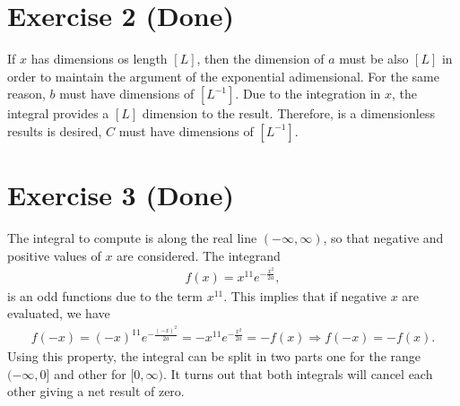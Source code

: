 \documentclass[letterpaper,11pt,twoside]{article}
\begin{document}
\section{Exercise 2 (Done)}
If $x$ has dimensions os length $[L]$, then the dimension of $a$ must be also $[L]$ in order to maintain the argument of the exponential adimensional.
For the same reason, $b$ must have dimensions of $[L^{-1}]$. Due to the integration in $x$, the integral provides a $[L]$ dimension to the result. Therefore,
is a dimensionless results is desired, $C$ must have dimensions of $[L^{-1}]$.

\section{Exercise 3 (Done)}
The integral to compute is along the real line $(-\infty,\infty)$, so that negative and positive values of $x$ are considered.
The integrand
\begin{align}
  f(x)=x^{11}e^{-\frac{x^2}{2a}},
\end{align}
is an odd functions due to the term $x^{11}$. This implies that if negative $x$ are evaluated, we have
\begin{align*}
  f(-x)=(-x)^{11}e^{-\frac{(-x)^2}{2a}}=-x^{11}e^{-\frac{x^2}{2a}}=-f(x)\Longrightarrow f(-x)=-f(x).
\end{align*}
Using this property, the integral can be split in two parts one for the range $(-\infty,0]$ and other for $[0,\infty)$.
It turns out that both integrals will cancel each other giving a net result of zero.
\end{document}
